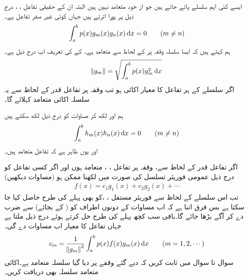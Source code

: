 ایسے کئی اہم سلسلے پائے جاتے ہیں جو از خود متعامد نہیں ہیں البتہ ان کے حقیقی تفاعل ، ،   درج ذیل پر پورا اترتے ہیں جہاں  کوئی غیر صفر تفاعل ہے۔
\begin{align}\label{مساوات_طاقتی_اضافی_عمودی_تفاعل_قدر_الف}
\int_{a}^{b} p(x) g_m(x)g_n(x)\dif x=0\quad \quad (m\ne n)
\end{align}  
ہم کہتے ہیں کہ ایسا سلسلہ وقفہ  پر   کے لحاظ سے متعامد ہے۔ کے  کی تعریف اب درج ذیل ہے۔
\begin{align}\label{مساوات_طاقتی_اضافی_معیار_قدر_تفاعل}
\norm{g_m}=\sqrt{\int_{a}^{b}p(x)g_m^2\dif x}
\end{align}
اگر سلسلے کے ہر تفاعل  کا معیار اکائی  ہو تب وقفہ  پر تفاعل قدر  کے لحاظ سے یہ سلسلہ اکائی متعامد کہلائے گا۔

ہم  اور  لکھ کر مساوات  کو درج ذیل لکھ سکتے ہیں
\begin{align*}
\int_{a}^{b}h_m(x)h_n(x)\dif x=0 \quad \quad (m\ne n)
\end{align*}
اور یوں ظاہر ہے کہ  تفاعل متعامد ہیں۔

اگر تفاعل قدر  کے لحاظ سے، وقفہ  پر تفاعل ، ،   متعامد ہوں اور اگر کسی تفاعل  کو درج ذیل عمومی فوریئر تسلسل کی صورت میں لکھنا ممکن ہو (مساوات  دیکھیں)
\begin{align}\label{مساوات_ضمیمہ_اضافی_تفاعل_قدر_تسلسل_الف}
f(x)=c_1g_1(x)+c_2g_2(x)+\cdots
\end{align} 
 تب اس سلسلے کے لحاظ سے فوریئر مستقل ، ، کو بھی پہلے کی طرح حاصل کیا جا سکتا ہے بس فرق اتنا ہے کہ اب مساوات
  کے دونوں اطراف کو ( کے بجائے)  سے ضرب دے کر آگے بڑھا جائے گا۔باقی سب کچھ پہلے کی طرح حل کرتے ہوئے درج ذیل ملتا ہے جہاں تفاعل کا معیار اب مساوات  دے گی۔ 
\begin{align}\label{مساوات_ضمیمہ_اضافی_تفاعل_قدر_تسلسل_عددی_سر}
c_m=\frac{1}{\norm{g_m}^2}\int_{a}^{b}p(x)f(x)g_m(x)\dif x\quad \quad (m=1,2,\cdots)
\end{align} 
سوال  تا سوال  میں ثابت کریں کہ دیے گئے وقفے پر دیا گیا سلسلہ متعامد ہے۔اکائی متعامد سلسلہ بھی دریافت کریں۔

